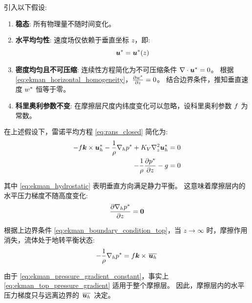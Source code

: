 引入以下假设:
\begin{enumerate}
    \item \textbf{稳态}: 所有物理量不随时间变化。

    \item \textbf{水平均匀性}: 速度场仅依赖于垂直坐标 $z$，即:
    \begin{equation}
        \bm{u}^* = \bm{u}^*(z)
        \label{eq:ekman_horizontal_homogeneity}
    \end{equation}

    \item \textbf{密度均匀且不可压缩}: 连续性方程简化为不可压缩条件 $\nabla \cdot \bm{u}^* = 0$。
    根据 \eqref{eq:ekman_horizontal_homogeneity}，$\pde{\flayer{w}}{z} = 0$。
    结合边界条件，推知垂直速度 $w^*$ 恒等于零。

    \item \textbf{科里奥利参数不变}: 在摩擦层尺度内纬度变化可以忽略，设科里奥利参数 $f$ 为常数。
\end{enumerate}

在上述假设下，雷诺平均方程 \eqref{eq:rans_closed} 简化为:
\begin{align}
    -\coriolis \kvec \times \flayer{\vel_h} - \frac{1}{\density} \nabla_h \flayer{\pressure} + \eddyviscv \nabla_z^2 \flayer{\vel_h} &= 0 \label{eq:ekman_momentum} \\
    -\frac{1}{\density} \pde{\flayer{\pressure}}{z} - \gravityconst &= 0 \label{eq:ekman_hydrostatic}
\end{align}

其中 \eqref{eq:ekman_hydrostatic} 表明垂直方向满足静力平衡。
这意味着摩擦层内的水平压力梯度不随高度变化:
\begin{equation}
    \pde{\nabla_h \flayer{\pressure}}{z} = \ivec{0}
    \label{eq:ekman_pressure_gradient_constant}
\end{equation}

根据上边界条件 \eqref{eq:ekman_boundary_condition_top}，当 $z \to \infty$ 时，摩擦作用消失，流体处于地转平衡状态:
\begin{equation}
    -\frac{1}{\rho} \nabla_h p^* = f \bm{k} \times \mkern2mu \overline{\bm{u}_h} \mkern2mu
    \label{eq:ekman_top_pressure_gradient}
\end{equation}

由于 \eqref{eq:ekman_pressure_gradient_constant}，事实上 \eqref{eq:ekman_top_pressure_gradient} 适用于整个摩擦层。
因此，摩擦层内的水平压力梯度只与远离边界的 $\mkern2mu \overline{\bm{u}_h} \mkern2mu$ 决定。

